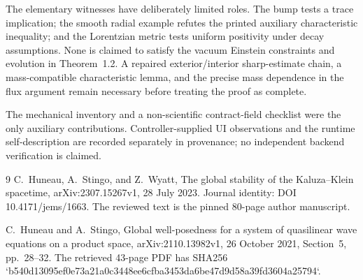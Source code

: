 \documentclass[10pt]{article}
\begin{document}
The elementary witnesses have deliberately limited roles. The bump tests a trace implication; the smooth radial example refutes the printed auxiliary characteristic inequality; and the Lorentzian metric tests uniform positivity under decay assumptions. None is claimed to satisfy the vacuum Einstein constraints and evolution in Theorem 1.2. A repaired exterior/interior sharp-estimate chain, a mass-compatible characteristic lemma, and the precise mass dependence in the flux argument remain necessary before treating the proof as complete.\par
The mechanical inventory and a non-scientific contract-field checklist were the only auxiliary contributions. Controller-supplied UI observations and the runtime self-description are recorded separately in provenance; no independent backend verification is claimed.\par
9 C. Huneau, A. Stingo, and Z. Wyatt, The global stability of the Kaluza–Klein spacetime, arXiv:2307.15267v1, 28 July 2023. Journal identity: DOI 10.4171/jems/1663. The reviewed text is the pinned 80-page author manuscript.\par
C. Huneau and A. Stingo, Global well-posedness for a system of quasilinear wave equations on a product space, arXiv:2110.13982v1, 26 October 2021, Section 5, pp. 28–32. The retrieved 43-page PDF has SHA256 `b540d13095ef0e73a21a0c3448ee6cfba3453da6be47d9d58a39fd3604a25794`.\par
\end{document}

